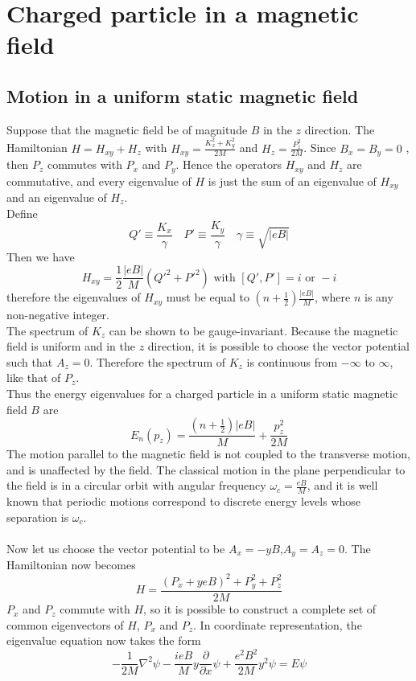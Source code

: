 \section{Charged particle in a magnetic field}
\subsection{Motion in a uniform static magnetic field} 
Suppose that the magnetic field be of magnitude $B$ in the $z$ direction. The Hamiltonian $H = H_{xy}+H_z$ with $H_{xy} = \frac{K_x^2+K_y^2}{2M}$ and $H_z = \frac{P_z^2}{2M}$. Since $B_x = B_y = 0$ , then $P_z$ commutes with $P_x$ and $P_y$. Hence the operators $H_{xy}$ and $H_z$ are commutative, and every eigenvalue of $H$ is just
the sum of an eigenvalue of $H_{xy}$ and an eigenvalue of $H_z$. \\
Define
\[Q' \equiv \frac{K_x}{\gamma} \quad P' \equiv \frac{K_y}{\gamma} \quad \gamma \equiv \sqrt{|eB|} \]
Then we have
\[H_{xy} = \frac{1}{2} \frac{|eB|}{M}(Q'^2+P'^2) \mbox{  with  } [Q',P'] = i \mbox{  or  }-i\]
therefore the eigenvalues of $H_{xy}$ must be equal to $(n+\frac{1}{2})\frac{|eB|}{M}$, where $n$ is any non-negative integer.\\
The spectrum of $K_z$ can be shown to be gauge-invariant.
Because the magnetic field is uniform and in the $z$ direction, it is possible to choose the vector potential such that $A_z = 0$. Therefore the spectrum of $K_z$ is
continuous from $-\infty$ to $\infty$, like that of $P_z$.\\
Thus the energy eigenvalues for a charged particle in a uniform static magnetic field $B$ are
\[E_n(p_z) = \frac{(n+\frac{1}{2})|eB|}{M} + \frac{p_z^2}{2M}\]
The motion parallel to the magnetic field is not coupled to the transverse motion, and is unaffected by the field. The classical motion in the plane perpendicular to the field is
in a circular orbit with angular frequency $\omega_c = \frac{eB}{M}$, and it is well known that periodic motions correspond to discrete energy levels whose separation is $\omega_c$.\\ \\
Now let us choose the vector potential to be $A_x=-yB$,$A_y=A_z=0$. The Hamiltonian now becomes
\[H = \frac{(P_x+yeB)^2 + P_y^2 + P_z^2}{2M}\]
$P_x$ and $P_z$ commute with $H$, so it is possible to construct a complete set of common eigenvectors of $H$, $P_x$ and $P_z$. In coordinate representation, the eigenvalue equation now takes the form
\[-\frac{1}{2M}\nabla^2 \psi - \frac{ieB}{M}y\frac{\partial}{\partial x}\psi + \frac{e^2B^2}{2M}y^2\psi = E\psi\]
